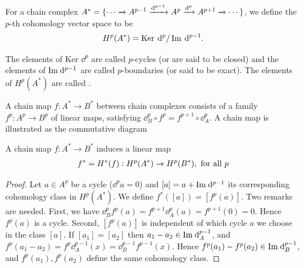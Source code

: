 \begin{definition}\label{definition:4-2}
  For a chain complex $A^* = \{\cdots\xra[] A^{p-1}\xra[\dd^{p-1}] A^p\xra[\dd^p] A^{p+1}\xra[]\cdots\}$, we define
  the $p$-th cohomology vector space to be
  \begin{align*}
    H^p(A^*) = \ker\dd^p/\im\dd^{p-1}.
  \end{align*}

  The elements of Ker $\dd^p$ are called $p$-cycles (or are said to be closed) and the
  elements of $\im\dd^{p-1}$ are called $p$-boundaries (or said to be exact). The elements
  of $H^p(A^*)$ are called .

  A chain map $f:A^*\to B^*$ between chain complexes consists of a family $f^p: A^p\to B^p$ of linear maps, satisfying
  $\dd_B^p\circ f^p = f^{p+1}\circ\dd^p_A$. A chain map is illustrated as the commutative diagram


  \begin{center}
  \end{center}
\end{definition}

\begin{lemma}\label{lemma:4-3}
  A chain map $f:A^*\to B^*$ induces a linear map
  \begin{align*}
    f^* = H^*(f): H^p(A^*)\xra[] H^p(B^*), \text{ for all } p
  \end{align*}
\end{lemma}

\begin{proof}
  Let $a\in A^p$ be a cycle ($\dd^pa = 0$) and $[a] = a + \im\dd^{p-1}$ its corresponding
  cohomology class in $H^p(A^*)$. We define $f^*([a]) = [f^p(a)]$. Two remarks are
  needed. First, we have $\dd^p_B f^p(a) = f^{p+1}\dd^p_A(a) = f^{p+1}(0) = 0$. Hence $f^p(a)$ is
  a cycle. Second, $[f^p(a)]$ is independent of which cycle $a$ we choose in the class
  $[a]$. If $[a_1] = [a_2]$ then $a_1-a_2\in\im\dd^{p-1}_A$, and $f^p(a_1-a_2) = f^p\dd^{p-1}_A(x)
    = \dd^{p-1}_Bf^{p-1}(x)$. Hence $f^p(a_1) - f^p(a_2) \in\im\dd^{p-1}_B$, and $f^p(a_1), f^p(a_2)$ define the
  same cohomology class.
\end{proof}

